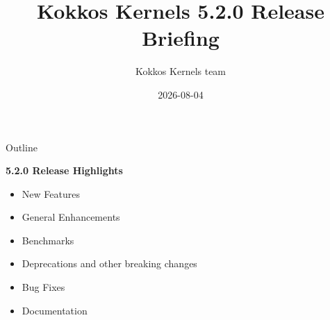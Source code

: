 
\usepackage{tikz}
\graphicspath{{kk_4_5/figures/}}

\def\sandid{SAND2026-24613PE}

\title{Kokkos Kernels 5.2.0 Release Briefing}

\author{Kokkos Kernels team}

\date{2026-08-04}



\shorttrue
\mediumfalse
\fullfalse



\begin{frame}
  \titlepage
\end{frame}


\begin{frame}[fragile]{Outline}

  \textbf{5.2.0 Release Highlights}

  \begin{itemize}
    \item{New Features}
    \item{General Enhancements}
    \item{Benchmarks}
    \item{Deprecations and other breaking changes}
    \item{Bug Fixes}
    \item{Documentation}
  \end{itemize}

\end{frame}

